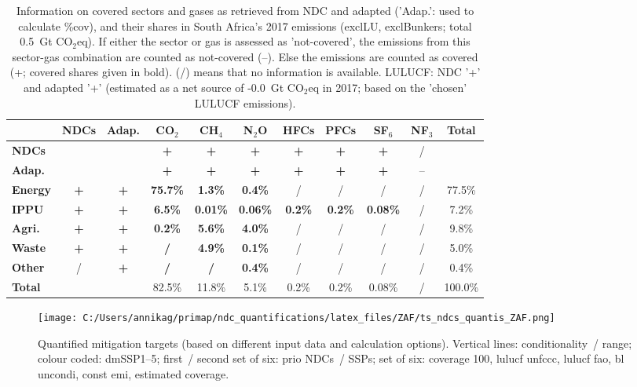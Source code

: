 \documentclass[12pt]{article}
\begin{document}
 \begin{table}[H]\small
 \centering
 \caption{Information on covered sectors and gases as retrieved from NDC and adapted ('Adap.': used to calculate \%cov), and their shares in South Africa's 2017 emissions (exclLU, exclBunkers; total 0.5~Gt CO$_2$eq).
 If either the sector or gas is assessed as 'not-covered', the emissions from this sector-gas combination are counted as not-covered (--). 
 Else the emissions are counted as covered (+; covered shares given in bold).
 (/) means that no information is available.
 LULUCF: NDC '+' and adapted '+' (estimated as a net source of -0.0~Gt CO$_2$eq in 2017; based on the 'chosen' LULUCF emissions).}
 \label{tab:coveredSectorsGases}
 \begin{tabular}{l || c c || c c c c c c c | c}
 \bfseries  & \bfseries NDCs & \bfseries Adap. & \bfseries CO$_2$ & \bfseries CH$_4$ & \bfseries N$_2$O & \bfseries HFCs & \bfseries PFCs & \bfseries SF$_6$ & \bfseries NF$_3$ & \bfseries Total \tabularnewline \hline \hline
 \bfseries NDCs &  &  & \bfseries + & \bfseries + & \bfseries + & \bfseries + & \bfseries + & \bfseries + & / &  \tabularnewline 
 \bfseries Adap. &  &  & \bfseries + & \bfseries + & \bfseries + & \bfseries + & \bfseries + & \bfseries + & -- &  \tabularnewline \hline \hline
 \bfseries Energy & \bfseries + & \bfseries + & \bfseries 75.7\% & \bfseries 1.3\% & \bfseries 0.4\% & / & / & / & / & 77.5\% \tabularnewline 
 \bfseries IPPU & \bfseries + & \bfseries + & \bfseries 6.5\% & \bfseries 0.01\% & \bfseries 0.06\% & \bfseries 0.2\% & \bfseries 0.2\% & \bfseries 0.08\% & / & 7.2\% \tabularnewline 
 \bfseries Agri. & \bfseries + & \bfseries + & \bfseries 0.2\% & \bfseries 5.6\% & \bfseries 4.0\% & / & / & / & / & 9.8\% \tabularnewline 
 \bfseries Waste & \bfseries + & \bfseries + & \bfseries / & \bfseries 4.9\% & \bfseries 0.1\% & / & / & / & / & 5.0\% \tabularnewline 
 \bfseries Other & / & \bfseries + & \bfseries / & \bfseries / & \bfseries 0.4\% & / & / & / & / & 0.4\% \tabularnewline \hline
 \bfseries Total &  &  & 82.5\% & 11.8\% & 5.1\% & 0.2\% & 0.2\% & 0.08\% & / & 100.0\% \tabularnewline 
 \end{tabular}
 \end{table}

 \begin{figure}[H]
 \centering
 \texttt{[image: C:/Users/annikag/primap/ndc\_quantifications/latex\_files/ZAF/ts\_ndcs\_quantis\_ZAF.png]}
 \caption{Quantified mitigation targets (based on different input data and calculation options).
 Vertical lines: conditionality~/ range;
 colour coded: dmSSP1--5;
 first~/ second set of six: prio NDCs~/ SSPs;
 set of six: coverage 100, lulucf unfccc, lulucf fao, bl uncondi, const emi, estimated coverage.}
 \label{fig:miti}
 \end{figure}
\end{document}
